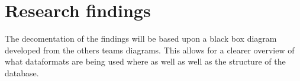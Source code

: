 \section{Research findings}
The decomentation of the findings will be based upon a black box diagram developed from the others teams diagrams. This allows for a clearer overview of what dataformats are being used where as well as well as the structure of the database. 


